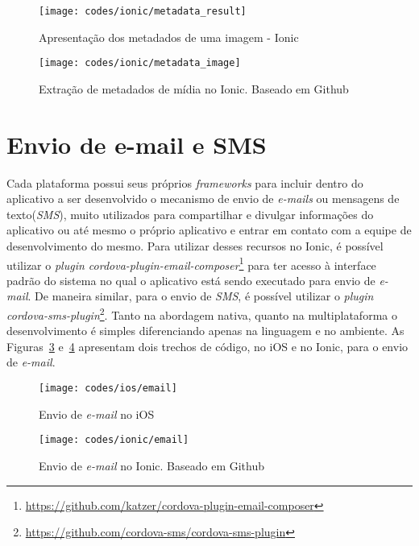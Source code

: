 \begin{figure}[H]
	\centering
	\texttt{[image: codes/ionic/metadata\_result]}
	\caption[Apresentação dos metadados de uma imagem - Ionic]{Apresentação dos metadados de uma imagem - Ionic}
	\label{fig:metadata_result-ionic}
\end{figure}

\begin{figure}[H]
	\centering
	\texttt{[image: codes/ionic/metadata\_image]}
	\caption[Extração de metadados de mídia no Ionic]{Extração de metadados de mídia no Ionic. Baseado em Github\protect\footnotemark}
	\label{fig:metadata_image-ionic}
\end{figure}

\section{Envio de e-mail e SMS} \label{subsubsec:emailsms}
Cada plataforma possui seus próprios \textit{frameworks} para incluir dentro do aplicativo a ser desenvolvido o mecanismo de envio de \textit{e-mails} ou mensagens de texto(\textit{SMS}), muito utilizados para compartilhar 
e divulgar informações do aplicativo ou até mesmo o próprio aplicativo e entrar em contato com a equipe de desenvolvimento do mesmo. Para utilizar desses recursos no Ionic, é possível utilizar o 
\textit{plugin cordova-plugin-email-composer}\footnote{\url{https://github.com/katzer/cordova-plugin-email-composer}} para ter acesso à interface padrão do sistema no qual o aplicativo está sendo executado para envio de 
\textit{e-mail}. De maneira similar, para o envio de \textit{SMS}, é possível utilizar o \textit{plugin cordova-sms-plugin}\footnote{\url{https://github.com/cordova-sms/cordova-sms-plugin}}. Tanto na abordagem nativa, 
quanto na multiplataforma o desenvolvimento é simples diferenciando apenas na linguagem e no ambiente. As Figuras~\ref{fig:email-ios} e~\ref{fig:email-ionic} apresentam dois trechos de código, no iOS e no Ionic, 
para o envio de \textit{e-mail}.
\begin{figure}[H]
	\centering
	\texttt{[image: codes/ios/email]}
	\caption[Envio de \textit{e-mail} no iOS]{Envio de \textit{e-mail} no iOS}
	\label{fig:email-ios}
\end{figure}
\begin{figure}[H]
	\centering
	\texttt{[image: codes/ionic/email]}
	\caption[Envio de \textit{e-mail} no Ionic]{Envio de \textit{e-mail} no Ionic. Baseado em Github\protect\footnotemark}
	\label{fig:email-ionic}
\end{figure}

